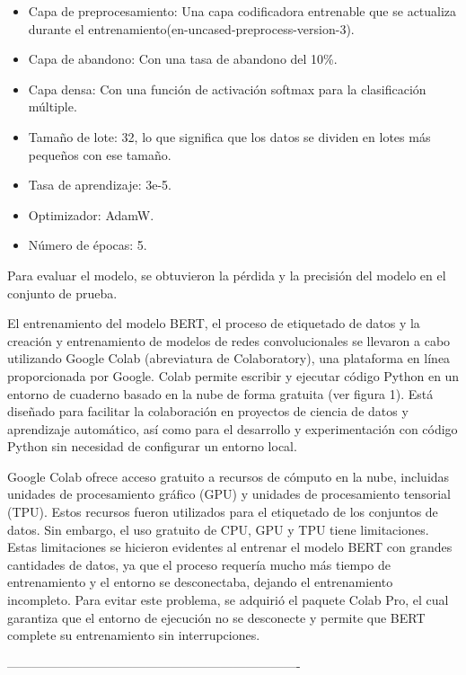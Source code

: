 \begin{itemize}

\item Capa de preprocesamiento: Una capa codificadora entrenable que se actualiza durante el entrenamiento(en-uncased-preprocess-version-3).
\item Capa de abandono: Con una tasa de abandono del 10\%.
\item Capa densa: Con una función de activación softmax para la clasificación múltiple.
\item Tamaño de lote: 32, lo que significa que los datos se dividen en lotes más pequeños con ese tamaño.
\item Tasa de aprendizaje: 3e-5.
\item Optimizador: AdamW.
\item Número de épocas: 5.

\end{itemize}

Para evaluar el modelo, se obtuvieron la pérdida y la precisión del modelo en el conjunto de prueba.

El entrenamiento del modelo BERT, el proceso de etiquetado de datos y la creación y entrenamiento de modelos de redes convolucionales se llevaron a cabo utilizando Google Colab (abreviatura de Colaboratory), una plataforma en línea proporcionada por Google. Colab permite escribir y ejecutar código Python en un entorno de cuaderno basado en la nube de forma gratuita (ver figura 1). Está diseñado para facilitar la colaboración en proyectos de ciencia de datos y aprendizaje automático, así como para el desarrollo y experimentación con código Python sin necesidad de configurar un entorno local.

Google Colab ofrece acceso gratuito a recursos de cómputo en la nube, incluidas unidades de procesamiento gráfico (GPU) y unidades de procesamiento tensorial (TPU). Estos recursos fueron utilizados para el etiquetado de los conjuntos de datos. Sin embargo, el uso gratuito de CPU, GPU y TPU tiene limitaciones. Estas limitaciones se hicieron evidentes al entrenar el modelo BERT con grandes cantidades de datos, ya que el proceso requería mucho más tiempo de entrenamiento y el entorno se desconectaba, dejando el entrenamiento incompleto. Para evitar este problema, se adquirió el paquete Colab Pro, el cual garantiza que el entorno de ejecución no se desconecte y permite que BERT complete su entrenamiento sin interrupciones.

----------------------------------------------------------------------

